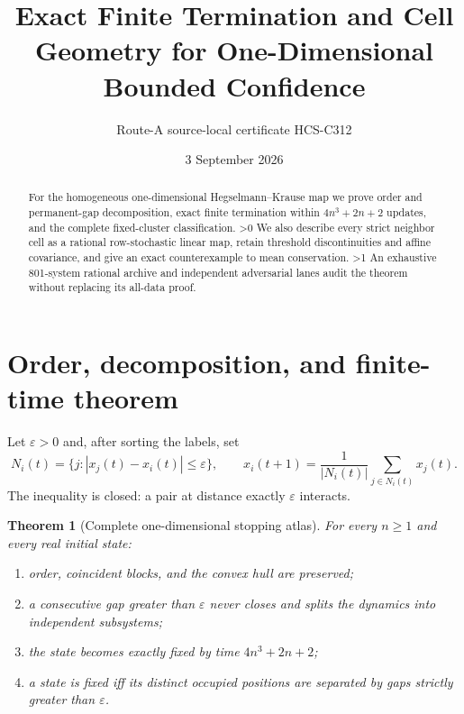 \documentclass[10pt]{article}
\title{Exact Finite Termination and Cell Geometry for One-Dimensional Bounded Confidence}
\author{Route-A source-local certificate HCS-C312}
\date{3 September 2026}
\providecommand{\CRevisionRound}{2}
\newtheorem{theorem}{Theorem}\newtheorem{lemma}{Lemma}
\begin{document}
\maketitle
\begin{abstract}
For the homogeneous one-dimensional Hegselmann--Krause map we prove order
and permanent-gap decomposition, exact finite termination within
$4n^3+2n+2$ updates, and the complete fixed-cluster classification.
\ifnum\CRevisionRound>0
We also describe every strict neighbor cell as a rational row-stochastic
linear map, retain threshold discontinuities and affine covariance, and give
an exact counterexample to mean conservation.
\fi
\ifnum\CRevisionRound>1
An exhaustive 801-system rational archive and independent adversarial lanes
audit the theorem without replacing its all-data proof.
\fi
\end{abstract}

\section{Order, decomposition, and finite-time theorem}
Let $\varepsilon>0$ and, after sorting the labels, set
\begin{equation}\label{eq:hk}
 N_i(t)=\{j:|x_j(t)-x_i(t)|\le\varepsilon\},\qquad
 x_i(t+1)=\frac1{|N_i(t)|}\sum_{j\in N_i(t)}x_j(t).
\end{equation}
The inequality is closed: a pair at distance exactly $\varepsilon$ interacts.

\begin{theorem}[Complete one-dimensional stopping atlas]\label{thm:hk}
For every $n\ge1$ and every real initial state:
\begin{enumerate}
\item order, coincident blocks, and the convex hull are preserved;
\item a consecutive gap greater than $\varepsilon$ never closes and splits
the dynamics into independent subsystems;
\item the state becomes exactly fixed by time $4n^3+2n+2$;
\item a state is fixed iff its distinct occupied positions are separated by
gaps strictly greater than $\varepsilon$.
\end{enumerate}
\end{theorem}
\end{document}
